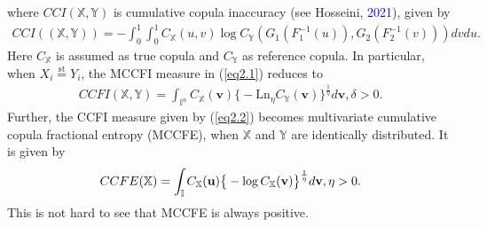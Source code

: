 \documentclass[12pt, a4paper]{article}
\numberwithin{equation}{section}
\begin{document}
where $CCI(\mathbb X,\mathbb Y)$ is cumulative copula inaccuracy (see Hosseini, \textcolor{blue}{2021}), given by 
\begin{align}\label{eq1.25}
	CCI((\mathbb{X},\mathbb{Y}))=-\int_{0}^{1}\int_{0}^{1}C_\mathbb{X}(u,v)\log C_\mathbb{Y}(G_1(F_1^{-1}(u)),G_2(F_2^{-1}(v))) dvdu.
\end{align}
 Here $C_{\mathbb X}$ is assumed as true copula and $C_{\mathbb Y}$ as reference copula.
In particular, when $X_i\overset{\mathrm{st}}{=}Y_i$, the MCCFI measure in (\ref{eq2.1}) reduces to
\begin{align}\label{eq2.2}
CCFI(\mathbb{X},\mathbb{Y})=\int_{\mathbb I^n}C_\mathbb{X}(\textbf{v})\big\{-\mathrm{Ln}_\eta C_\mathbb{Y}(\textbf{v})\big\}^{\frac{1}{\eta}}d\textbf{v},\delta>0.
\end{align} 
Further, the CCFI measure given by (\ref{eq2.2}) becomes multivariate  cumulative copula  fractional entropy (MCCFE), when $\mathbb{X}$ and $\mathbb{Y}$ are identically distributed. It is given by
\begin{align}\label{eq2.3}
CCFE(\mathbb{X})=\int_{\mathbb I}C_{\mathbb X}(\textbf u)\big\{-\log C_\mathbb{X}(\textbf{v})\big\}^{\frac{1}{\eta}}d\textbf{v},\eta>0.
\end{align} 
 This is not hard to see that MCCFE is always positive. 
 
\end{document}
